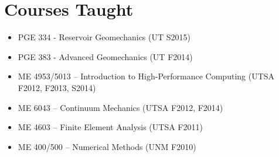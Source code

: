 \section*{Courses Taught}

  \begin{itemize}
      \item PGE 334 - Reservoir Geomechanics (UT S2015)
      \item PGE 383 - Advanced Geomechanics (UT F2014)
      \item ME 4953/5013 -- Introduction to High-Performance Computing (UTSA F2012, F2013, S2014)
      \item ME 6043 -- Continuum Mechanics (UTSA F2012, F2014)
      \item ME 4603 -- Finite Element Analysis (UTSA F2011)
      \item ME 400/500 -- Numerical Methods (UNM F2010)
  \end{itemize}

